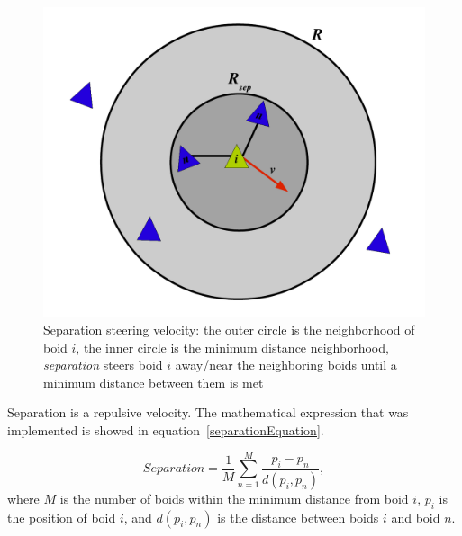 \begin{figure}[htbp]
\begin{center}
\includegraphics[scale=0.6]{figures/separation.pdf}
\caption{Separation steering velocity: the outer circle is the neighborhood of boid $i$, the inner circle is the minimum distance neighborhood, \textit{separation} steers boid $i$ away/near the neighboring boids until a minimum distance between them is met}
\label{separationPDF}
\end{center}
\end{figure}

Separation is a repulsive velocity. The mathematical expression that was implemented is showed in equation~\ref{separationEquation}.

\begin{equation}
\label{separationEquation}
Separation =\frac{1}{M} \sum_{n=1}^{M} \frac{p_i - p_n}{d(p_i,p_n)},
\end{equation}
where $M$ is the number of boids within the minimum distance from boid $i$, $p_i$ is the position of boid $i$, and $d(p_i,p_n)$ is the distance between boids $i$ and boid $n$.


